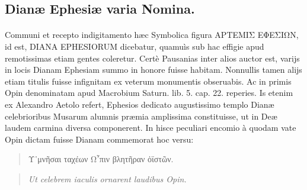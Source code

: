 \documentclass[a4paper, 11pt, oneside, polutonikogreek, latin]{article}
\begin{document}
\subsection{Dianæ Ephesiæ varia Nomina.}
\paragraph{}
Communi et recepto indigitamento hæc Symbolica figura \foreignlanguage{greek}{ΑΡΤΕΜΙΣ ΕΦΕΣΙΩΝ}, id est, DIANA EPHESIORUM dicebatur, quamuìs sub hac effigie apud remotissimas etiam gentes coleretur. Certè Pausanias inter alios auctor est, varijs in locis Dianam Ephesiam summo in honore fuisse habitam. Nonnullis tamen alijs etiam titulis fuisse infignitam ex veterum monumentis obseruabis. Ac in primis Opin denominatam apud Macrobium Saturn. lib. 5. cap. 22. reperies. Is etenim ex Alexandro Aetolo refert, Ephesios dedicato augustissimo templo Dianæ celebrioribus Musarum alumnis præmia amplissima constituisse, ut in Deæ laudem carmina diversa componerent. In hisce peculiari encomio à quodam vate Opin dictam fuisse Dianam commemorat hoc versu:
\begin{quote}
Υ῾μνῆσαι ταχέων Ω῏πιν βλητῆραν ὀϊστῶν.
\end{quote}
\begin{quote}
\emph{Ut celebrem iaculis ornarent laudibus Opin.}
\end{quote}
\vspace*{-4mm}
\end{document}
